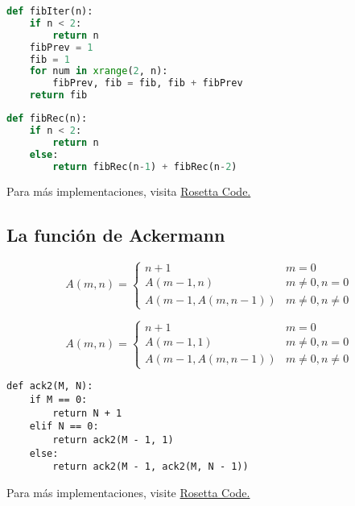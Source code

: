 \begin{lstlisting}[language=Python, caption=Implentación iterativa de \emph{Fibonacci} en \texttt{Python}]
def fibIter(n):
	if n < 2:
		return n
	fibPrev = 1
	fib = 1
	for num in xrange(2, n):
		fibPrev, fib = fib, fib + fibPrev
	return fib
\end{lstlisting}


\begin{lstlisting}[language=Python, caption=Implentación recursiva de \emph{Fibonacci} en \texttt{Python}]
def fibRec(n):
	if n < 2:
		return n
	else:
		return fibRec(n-1) + fibRec(n-2)
\end{lstlisting}

Para más implementaciones, visita \href{http://rosettacode.org/wiki/Fibonacci\_sequence}{Rosetta Code.}


\subsection{La función de Ackermann}


	\begin{definicion}
		$$
		A(m,n)=
		\begin{cases}
			n+1 & m=0\\
			A(m-1,n) & m\neq0, n=0 \\
			A(m-1, A(m,n-1)) & m\neq 0, n\neq 0
		\end{cases}
		$$
	\end{definicion}




	\begin{definicion}
		$$
		A(m,n)=
		\begin{cases}
			n+1 & m=0\\
			A(m-1,1) & m\neq0, n=0 \\
			A(m-1, A(m,n-1)) & m\neq 0, n\neq 0
		\end{cases}
		$$
	\end{definicion}



\begin{lstlisting}[caption=python, caption=Implentación recursiva de \emph{Ackermann} en \texttt{Python}]
def ack2(M, N):
	if M == 0:
		return N + 1
	elif N == 0:
		return ack2(M - 1, 1)
	else:
		return ack2(M - 1, ack2(M, N - 1))
\end{lstlisting}

Para más implementaciones, visite \href{http://rosettacode.org/wiki/Ackermann\_function}{Rosetta Code.}


